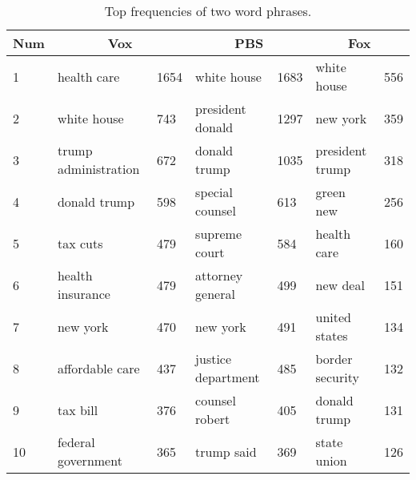 \begin{table}[H]
    \centering
    \caption{Top frequencies of two word phrases.}
    \label{tab:2gram}
    \begin{tabular}{|l|ll|ll|ll|}
    \hline
    Num & \multicolumn{2}{c|}{Vox}           & \multicolumn{2}{c|}{PBS}          & \multicolumn{2}{c}{Fox} \\ \hline \hline
    1   & health care          & 1654 & white house        & 1683 & white house     & 556 \\
    2   & white house          & 743  & president donald   & 1297 & new york        & 359 \\
    3   & trump administration & 672  & donald trump       & 1035 & president trump & 318 \\
    4   & donald trump         & 598  & special counsel    & 613  & green new       & 256 \\
    5   & tax cuts             & 479  & supreme court      & 584  & health care     & 160 \\
    6   & health insurance     & 479  & attorney general   & 499  & new deal        & 151 \\
    7   & new york             & 470  & new york           & 491  & united states   & 134 \\
    8   & affordable care      & 437  & justice department & 485  & border security & 132 \\
    9   & tax bill             & 376  & counsel robert     & 405  & donald trump    & 131 \\
    10  & federal government   & 365  & trump said         & 369  & state union     & 126 \\ \hline
    \end{tabular}
\end{table}